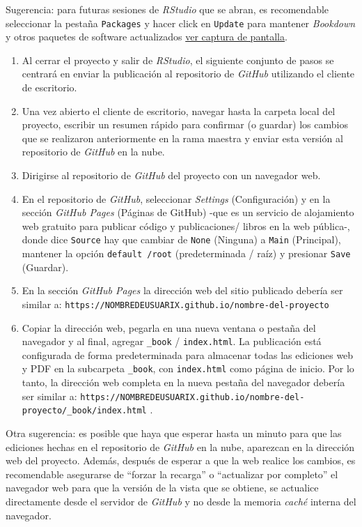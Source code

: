 \documentclass[
]{book}
\begin{document}
Sugerencia: para futuras sesiones de \emph{RStudio} que se abran, es recomendable seleccionar la pestaña \texttt{Packages} y hacer click en \texttt{Update} para mantener \emph{Bookdown} y otros paquetes de software actualizados
\href{images/update-packages.png}{ver captura de pantalla}.

\begin{enumerate}
\def\labelenumi{\arabic{enumi}.}
\setcounter{enumi}{8}
\item
  Al cerrar el proyecto y salir de \emph{RStudio}, el siguiente conjunto de pasos se centrará en enviar la publicación al repositorio de \emph{GitHub} utilizando el cliente de escritorio.
\item
  Una vez abierto el cliente de escritorio, navegar hasta la carpeta local del proyecto, escribir un resumen rápido para confirmar (o guardar) los cambios que se realizaron anteriormente en la rama maestra y enviar esta versión al repositorio de \emph{GitHub} en la nube.
\item
  Dirigirse al repositorio de \emph{GitHub} del proyecto con un navegador web.
\item
  En el repositorio de \emph{GitHub}, seleccionar \emph{Settings} (Configuración) y en la sección \emph{GitHub Pages} (Páginas de GitHub) -que es un servicio de alojamiento web gratuito para publicar código y publicaciones/ libros en la web pública-, donde dice \texttt{Source} hay que cambiar de \texttt{None} (Ninguna) a \texttt{Main} (Principal), mantener la opción \texttt{default\ /root} (predeterminada / raíz) y presionar \texttt{Save} (Guardar).
\item
  En la sección \emph{GitHub Pages} la dirección web del sitio publicado debería ser similar a: \texttt{https://NOMBREDEUSUARIX.github.io/nombre-del-proyecto}
\item
  Copiar la dirección web, pegarla en una nueva ventana o pestaña del navegador y al final, agregar \texttt{\_book} / \texttt{index.html}. La publicación está configurada de forma predeterminada para almacenar todas las ediciones web y PDF en la subcarpeta \texttt{\_book}, con \texttt{index.html} como página de inicio. Por lo tanto, la dirección web completa en la nueva pestaña del navegador debería ser similar a: \texttt{https://NOMBREDEUSUARIX.github.io/nombre-del-proyecto/\_book/index.html} .
\end{enumerate}

Otra sugerencia: es posible que haya que esperar hasta un minuto para que las ediciones hechas en el repositorio de \emph{GitHub} en la nube, aparezcan en la dirección web del proyecto. Además, después de esperar a que la web realice los cambios, es recomendable asegurarse de ``forzar la recarga'' o ``actualizar por completo'' el navegador web para que la versión de la vista que se obtiene, se actualice directamente desde el servidor de \emph{GitHub} y no desde la memoria \emph{caché} interna del navegador.
\end{document}
